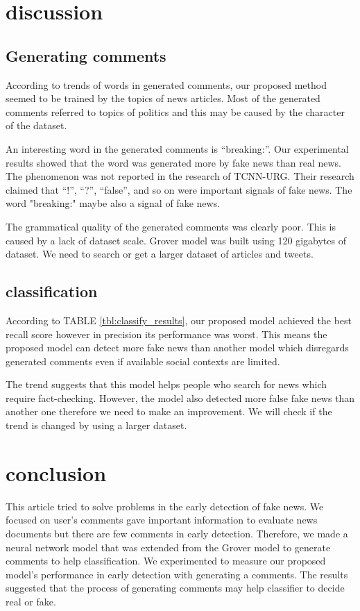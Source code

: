 \documentclass[conference]{IEEEtran}
\begin{document}
\section{discussion}
\subsection{Generating comments}
According to trends of words in generated comments,
our proposed method seemed to be trained by the topics of news articles.
Most of the generated comments referred to topics of politics and this may be caused by the character of the dataset.

An interesting word in the generated comments is ``breaking:''.
Our experimental results showed that the word was generated more by fake news than real news.
The phenomenon was not reported in the research of TCNN-URG\cite{ijcai2018-533}.
Their research claimed that ``!'', ``?'', ``false'', and so on were important signals of fake news.
The word "breaking:" maybe also a signal of fake news.

The grammatical quality of the generated comments was clearly poor.
This is caused by a lack of dataset scale. 
Grover model was built using 120 gigabytes of dataset\cite{NIPS2019_9106}.
We need to search or get a larger dataset of articles and tweets.

\subsection{classification}
According to TABLE \ref{tbl:classify_results}, our proposed model achieved the best recall score however in precision its performance was worst.
This means the proposed model can detect more fake news than another model which disregards generated comments even if available social contexts are limited. 

The trend suggests that this model helps people who search for news which require fact-checking. 
However, the model also detected more false fake news than another one therefore we need to make an improvement.
We will check if the trend is changed by using a larger dataset.

\section{conclusion}
This article tried to solve problems in the early detection of fake news.
We focused on user's comments gave important information to evaluate news documents but there are few comments in early detection.
Therefore, we made a neural network model that was extended from the Grover model to generate comments to help classification.
We experimented to measure our proposed model's performance in early detection with generating a comments.
The results suggested that the process of generating comments may help classifier to decide real or fake. 
\end{document}
